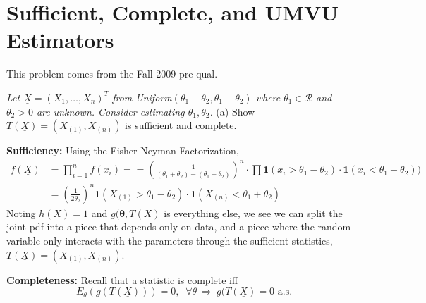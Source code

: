 \documentclass[11pt]{report}
\begin{document}
\chapter{Sufficient, Complete, and UMVU Estimators}
This problem comes from the Fall 2009 pre-qual. 

\emph{
Let $\underline{X} = (X_1, \dots, X_n)^T$ from Uniform$(\theta_1-\theta_2, \theta_1+\theta_2)$ where $\theta_1 \in \mathcal{R}$ and $\theta_2 > 0$ are unknown. Consider estimating $\theta_1, \theta_2$. }
\newline
(a) Show $T(\underline{X}) = (X_{(1)}, X_{(n)})$ is sufficient and complete.

\textbf{Sufficiency:} Using the Fisher-Neyman Factorization,
\begin{align*}
f(\underline{X}) &= \prod_{i=1}^n f(x_i) = 
 = \left( \frac{1}{(\theta_1+\theta_2) - (\theta_1-\theta_2)} \right)^n
\cdot \prod \mathbf{1}(x_i > \theta_1-\theta_2) \cdot \mathbf{1}( x_i < \theta_1+\theta_2) ) \\
&= \left( \frac{1}{2 \theta_2} \right)^n \mathbf{1}( { X_{(1)} > \theta_1-\theta_2}) \cdot \mathbf{1}( X_{(n)} < \theta_1 + \theta_2)
\end{align*}
Noting $h(X) = 1$ and $g(\mathbf{\theta}, T(\underline{X})$ is everything else, we see we can split the joint pdf into a piece that depends only on data, and a piece where the random variable only interacts with the parameters through the sufficient statistics, $T(\underline{X}) = (X_{(1)}, X_{(n)})$. 

\textbf{Completeness:} Recall that a statistic is complete iff 
\[ E_\theta(g(T(\underline{X}))) = 0, \;\; \forall \theta\ \Rightarrow\  g(T(\underline{X}) = 0 \text{ a.s.} \]
\end{document}
